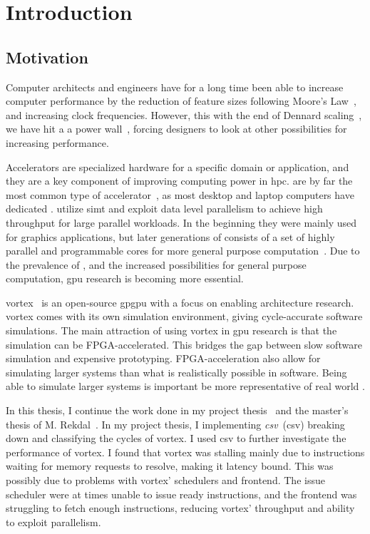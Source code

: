\chapter{Introduction}

\section{Motivation}

Computer architects and engineers have for a long time been able to increase computer performance by the reduction of feature sizes following Moore's Law~\cite{moore}, and increasing clock frequencies. However, this with the end of Dennard scaling~\cite{dennard_scaling}, we have hit a a power wall~\cite{powerwall}, forcing designers to look at other possibilities for increasing performance. 

Accelerators are specialized hardware for a specific domain or application, and they are a key component of improving computing power in \acrfull{hpc}.  are by far the most common type of accelerator~\cite{gpu_trends}, as most desktop and laptop computers have dedicated .  utilize \acrshort{simt} and exploit data level parallelism to achieve high throughput for large parallel workloads. In the beginning they were mainly used for graphics applications, but later generations of  consists of a set of highly parallel and programmable cores for more general purpose computation~\cite{gpu_history}. Due to the prevalence of , and the increased possibilities for general purpose computation, \acrshort{gpu} research is becoming more essential.

\Gls{vortex}~\cite{vortex} is an open-source \acrshort{gpgpu} with a focus on enabling architecture research. \Gls{vortex} comes with its own simulation environment, giving cycle-accurate software simulations. The main attraction of using \Gls{vortex} in \acrshort{gpu} research is that the simulation can be FPGA-accelerated. This bridges the gap between slow software simulation and expensive prototyping. FPGA-acceleration also allow for simulating larger systems than what is realistically possible in software. Being able to simulate larger systems is important be more representative of real world .

In this thesis, I continue the work done in my project thesis~\cite{Aurud_Project} and the master's thesis of M. Rekdal~\cite{Rekdal_Master}. In my project thesis, I implementing \textit{\acrlong{csv}}~(\acrshort{csv}) breaking down and classifying the cycles of \Gls{vortex}. I used \acrshort{csv} to further investigate the performance of \Gls{vortex}. I found that \Gls{vortex} was stalling mainly due to instructions waiting for memory requests to resolve, making it latency bound. This was possibly due to problems with \Gls{vortex}' schedulers and frontend. The issue scheduler were at times unable to issue ready instructions, and the frontend was struggling to fetch enough instructions, reducing \Gls{vortex}' throughput and ability to exploit parallelism. 

